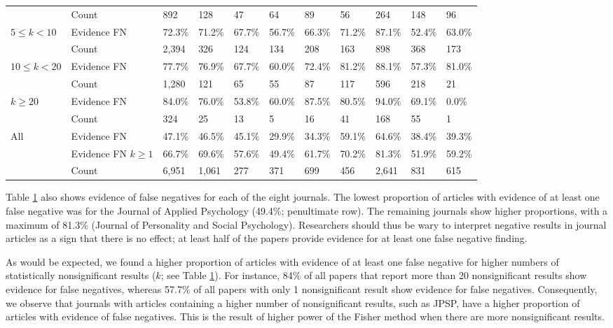 \documentclass{article}
\begin{document}
\begin{table}[htbp]
\begin{adjustbox}{width=\textwidth,totalheight=\textheight,keepaspectratio,angle=0}
\begin{tabular}{lllllllllll}
& Count             & 892    & 128    & 47     & 64     & 89     & 56     & 264    & 148    & 96     \\
$5\leq k<10$  & Evidence FN       & 72.3\% & 71.2\% & 67.7\% & 56.7\% & 66.3\% & 71.2\% & 87.1\% & 52.4\% & 63.0\% \\
& Count             & 2,394   & 326    & 124    & 134    & 208    & 163    & 898    & 368    & 173    \\
$10\leq k<20$ & Evidence FN       & 77.7\% & 76.9\% & 67.7\% & 60.0\% & 72.4\% & 81.2\% & 88.1\% & 57.3\% & 81.0\% \\
& Count             & 1,280   & 121    & 65     & 55     & 87     & 117    & 596    & 218    & 21     \\
$k\geq20$              & Evidence FN       & 84.0\% & 76.0\% & 53.8\% & 60.0\% & 87.5\% & 80.5\% & 94.0\% & 69.1\% & 0.0\%  \\
& Count             & 324    & 25     & 13     & 5      & 16     & 41     & 168    & 55     & 1      \\
\hline
All                 & Evidence FN       & 47.1\% & 46.5\% & 45.1\% & 29.9\% & 34.3\% & 59.1\% & 64.6\% & 38.4\% & 39.3\% \\
& Evidence FN $k\geq1$ & 66.7\% & 69.6\% & 57.6\% & 49.4\% & 61.7\% & 70.2\% & 81.3\% & 51.9\% & 59.2\% \\
& Count             & 6,951   & 1,061   & 277    & 371    & 699    & 456    & 2,641   & 831    & 615   \\
\hline
\end{tabular}
\end{adjustbox}
\label{tab:tab4}
\end{table}

Table \ref{tab:tab4} also shows evidence of false negatives for each of the eight journals. The lowest proportion of articles with evidence of at least one false negative was for the Journal of Applied Psychology (49.4\%; penultimate row). The remaining journals show higher proportions, with a maximum of 81.3\% (Journal of Personality and Social Psychology). Researchers should thus be wary to interpret negative results in journal articles as a sign that there is no effect; at least half of the papers provide evidence for at least one false negative finding.

As would be expected, we found a higher proportion of articles with evidence of at least one false negative for higher numbers of statistically nonsignificant results ($k$; see Table \ref{tab:tab4}). For instance, 84\% of all papers that report more than 20 nonsignificant results show evidence for false negatives, whereas 57.7\% of all papers with only 1 nonsignificant result show evidence for false negatives. Consequently, we observe that journals with articles containing a higher number of nonsignificant results, such as JPSP, have a higher proportion of articles with evidence of false negatives. This is the result of higher power of the Fisher method when there are more nonsignificant results.
\end{document}
